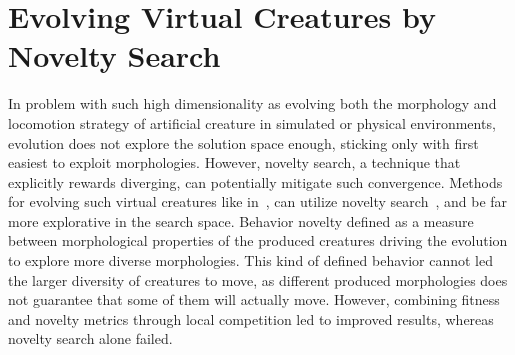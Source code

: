 \section{Evolving Virtual Creatures by Novelty Search}

In problem with such high dimensionality as evolving both the morphology and locomotion strategy of artificial creature in simulated or physical environments, evolution does not explore the solution space enough, sticking only with first easiest to exploit morphologies. However, novelty search, a technique that explicitly rewards diverging, can potentially mitigate such convergence. Methods for evolving such virtual creatures like in~\citep{sims1994evolving}, can utilize novelty search~\citep{lehman2011evolving}, and be far more explorative in the search space. Behavior novelty defined as a measure between morphological properties of the produced creatures driving the evolution to explore more diverse morphologies. This kind of defined behavior cannot led the larger diversity of creatures to move, as different produced morphologies does not guarantee that some of them will actually move. However, combining fitness and novelty metrics through local competition led to improved results, whereas novelty search alone failed. 



\begin{comment}
\section{Evolving gaits}
\todo{Not much idea of what to add here and where I should focus (space?)}
\citep{auerbach2012relationship} On  the  relationship  between  environmental and mechanical complexity in evolved robots.
\citep{lee2013evolving} Evolving gaits  for  physical  robots  with  the  hyperneat  generative  encoding:   The  benefits  of simulation.
\end{comment}

\begin{comment}
\section*{\todo{Additional material that can be added later}}
\citep{clune2011performance}
\citep{clune2013evolutionary}
\citep{lipson2000automatic}
\citep{hiller2010evolving}
\citep{rieffel2014growing}
by tom: \citep{Paoletti07092014}
\end{comment}


